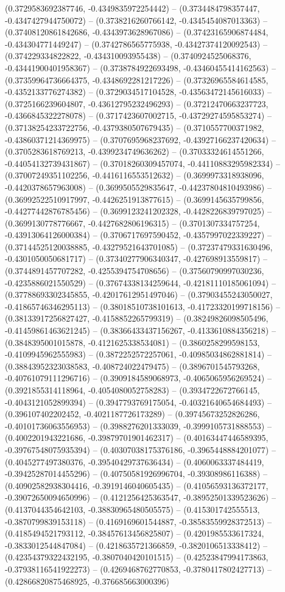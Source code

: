 (0.3729583692387746, -0.4349835972254442) -- (0.3734484798357447, -0.4347427944750072) -- (0.3738216260766142, -0.4345454087013363) -- (0.37408120861842686, -0.4343973628967086) -- (0.37423165906874484, -0.434304771449247) -- (0.3742786565775938, -0.43427374120092543) -- (0.374229334822822, -0.434310093955438) -- (0.3740924525068376, -0.43441900401958367) -- (0.3738784922693498, -0.43460455414162563) -- (0.37359964736664375, -0.4348692281217226) -- (0.37326965584614585, -0.4352133776274382) -- (0.3729034517104528, -0.43563472145616033) -- (0.3725166239604807, -0.43612795232496293) -- (0.37212470663237723, -0.4366845322278078) -- (0.3717423607002715, -0.43729274595853274) -- (0.37138254233722756, -0.4379380507679435) -- (0.3710557700371982, -0.43860371214369975) -- (0.3707695968237692, -0.43927166237420634) -- (0.3705283618769213, -0.4399234749636262) -- (0.37033324614551266, -0.44054132739431867) -- (0.37018260309457074, -0.44110883295982334) -- (0.37007249351102256, -0.4416116553512632) -- (0.3699973318938096, -0.4420378657963008) -- (0.3699505529835647, -0.44237804810493986) -- (0.36992522510917997, -0.4426251913877615) -- (0.3699145635799856, -0.44277442876785456) -- (0.3699123241202328, -0.4428226839797025) -- (0.3699130778776667, -0.4427682806196315) -- (0.3701307334757254, -0.43913064126000384) -- (0.3706717697590452, -0.4357997022339227) -- (0.37144525120038885, -0.43279521643701085) -- (0.37237479331630496, -0.4301050050681717) -- (0.37340277906340347, -0.427698913559817) -- (0.3744891457707282, -0.4255394754708656) -- (0.37560790997030236, -0.4235886021550529) -- (0.37674338134259644, -0.42181110185061094) -- (0.37788693302345855, -0.42017612951497046) -- (0.37903455243050027, -0.41865746346295113) -- (0.38018510738101613, -0.41723320199718156) -- (0.38133917256827427, -0.4158852265799319) -- (0.38249826098505496, -0.41459861463621245) -- (0.38366433437156267, -0.4133610884356218) -- (0.3848395001015878, -0.4121625338534081) -- (0.3860258299598153, -0.4109945962555983) -- (0.3872252572257061, -0.40985034862881814) -- (0.38843952323038583, -0.408724022479475) -- (0.3896701545793268, -0.40761079111296716) -- (0.3909184589068973, -0.4065065956269524) -- (0.3921855314118964, -0.4054080052758283) -- (0.3934722672766145, -0.4043121052899394) -- (0.3947793769175054, -0.40321640654684493) -- (0.396107402202452, -0.4021187726173289) -- (0.39745673252826286, -0.40101736063556953) -- (0.3988276201333039, -0.3999105731888553) -- (0.4002201943221686, -0.39879701901462317) -- (0.40163447446589395, -0.39767548075935394) -- (0.40307038175376186, -0.3965448884201077) -- (0.4045277497380376, -0.39540429737636434) -- (0.4060063337484419, -0.39425287014455296) -- (0.40750581926996704, -0.39308986116388) -- (0.40902582938304416, -0.3919146040605435) -- (0.41056593136372177, -0.39072650094650996) -- (0.4121256425363547, -0.38952501339523626) -- (0.4137044354642103, -0.38830965480505575) -- (0.415301742555513, -0.3870799839153118) -- (0.4169169601544887, -0.38583559928372513) -- (0.4185494521793112, -0.38457613456825807) -- (0.4201985533617324, -0.3833012544847084) -- (0.4218635721366859, -0.3820106513338412) -- (0.42354379322432195, -0.3807040420101515) -- (0.42523847994173863, -0.37938116541922273) -- (0.4269468762770853, -0.3780417802427713) -- (0.42866820875468925, -0.376685663000396) 